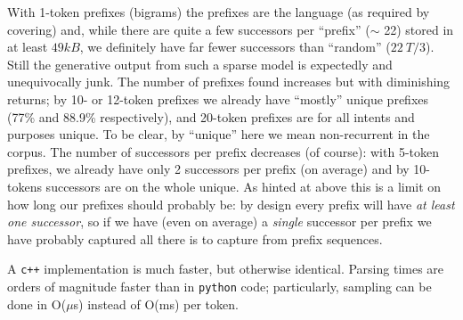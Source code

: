 \documentclass[11pt, oneside]{amsart}   	%
\begin{document}
With 1-token prefixes (bigrams) the prefixes are the language (as required by covering) and, while there are quite a few successors per ``prefix'' ($\sim$ 22) stored in at least $49kB$, we definitely have far fewer successors than ``random'' ($22 ~ T/3$). Still the generative output from such a sparse model is expectedly and unequivocally junk. The number of prefixes found increases but with diminishing returns; by 10- or 12-token prefixes we already have ``mostly'' unique prefixes (77\% and 88.9\% respectively), and 20-token prefixes are for all intents and purposes unique. To be clear, by ``unique'' here we mean non-recurrent in the corpus. The number of successors per prefix decreases (of course): with 5-token prefixes, we already have only 2 successors per prefix (on average) and by 10-tokens successors are on the whole unique. As hinted at above this is a limit on how long our prefixes should probably be: by design every prefix will have {\em at least one successor}, so if we have (even on average) a {\em single} successor per prefix we have probably captured all there is to capture from prefix sequences. 

A \texttt{c++} implementation is much faster, but otherwise identical. Parsing times are orders of magnitude faster than in \texttt{python} code; particularly, sampling can be done in O($\mu$s) instead of O(ms) per token. 
\end{document}
